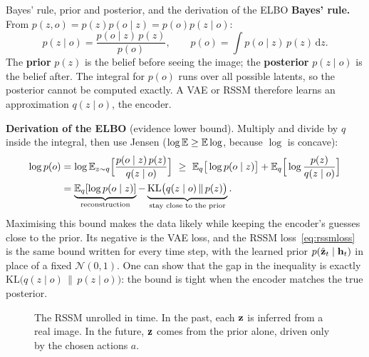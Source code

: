 \begin{probbox}{Bayes' rule, prior and posterior, and the derivation of the ELBO}
\textbf{Bayes' rule.} From $p(z,o)=p(z)p(o\mid z)=p(o)p(z\mid o)$:
\[
p(z\mid o)=\frac{p(o\mid z)\,p(z)}{p(o)},\qquad p(o)=\int p(o\mid z)\,p(z)\,\mathrm dz .
\]
The \textbf{prior} $p(z)$ is the belief before seeing the image; the \textbf{posterior} $p(z\mid o)$ is the belief after. The integral for $p(o)$ runs over all possible latents, so the posterior cannot be computed exactly. A VAE or RSSM therefore learns an approximation $q(z\mid o)$, the encoder.

\textbf{Derivation of the ELBO} (evidence lower bound). Multiply and divide by $q$ inside the integral, then use Jensen ($\log\mathbb{E}\ge\mathbb{E}\log$, because $\log$ is concave):
\begin{align*}
\log p(o)&=\log\mathbb{E}_{z\sim q}\Big[\frac{p(o\mid z)\,p(z)}{q(z\mid o)}\Big]\ \ge\ \mathbb{E}_q\big[\log p(o\mid z)\big]+\mathbb{E}_q\Big[\log\frac{p(z)}{q(z\mid o)}\Big]\\
&=\underbrace{\mathbb{E}_q[\log p(o\mid z)]}_{\text{reconstruction}}-\underbrace{\mathrm{KL}\big(q(z\mid o)\,\|\,p(z)\big)}_{\text{stay close to the prior}} .
\end{align*}
Maximising this bound makes the data likely while keeping the encoder's guesses close to the prior. Its negative is the VAE loss, and the RSSM loss~\eqref{eq:rssmloss} is the same bound written for every time step, with the learned prior $p(\hat{\mathbf{z}}_t\mid\mathbf{h}_t)$ in place of a fixed $\mathcal N(0,1)$. One can show that the gap in the inequality is exactly $\mathrm{KL}\big(q(z\mid o)\,\|\,p(z\mid o)\big)$: the bound is tight when the encoder matches the true posterior.
\end{probbox}

\begin{figure}[h]
\centering
{}
\caption{The RSSM unrolled in time. In the past, each $\mathbf{z}$ is inferred from a real image. In the future, $\mathbf{z}$ comes from the prior alone, driven only by the chosen actions $a$.}
\label{fig:rssm}
\end{figure}

